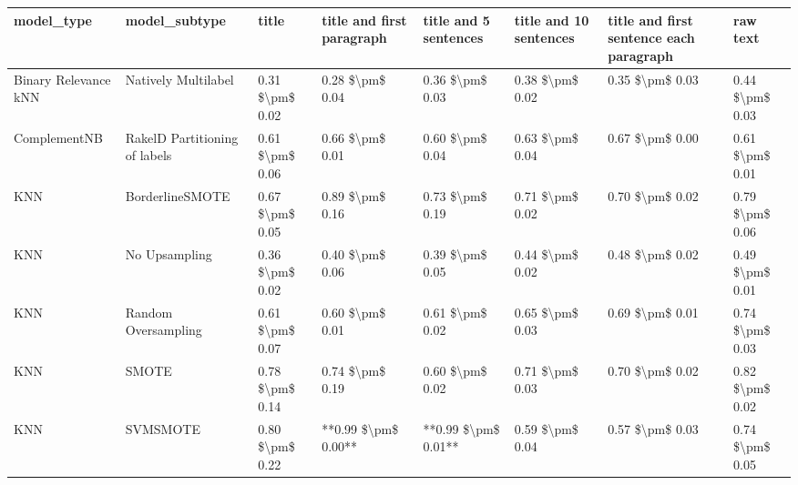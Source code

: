 \begin{tabular}{llllllll}
\toprule
                     model\_type &                 model\_subtype &           title & title and first paragraph & title and 5 sentences & title and 10 sentences & title and first sentence each paragraph &        raw text \\
\midrule
           Binary Relevance kNN &           Natively Multilabel & 0.31 \$\textbackslash pm\$ 0.02 &           0.28 \$\textbackslash pm\$ 0.04 &       0.36 \$\textbackslash pm\$ 0.03 &        0.38 \$\textbackslash pm\$ 0.02 &                         0.35 \$\textbackslash pm\$ 0.03 & 0.44 \$\textbackslash pm\$ 0.03 \\
                   ComplementNB & RakelD Partitioning of labels & 0.61 \$\textbackslash pm\$ 0.06 &           0.66 \$\textbackslash pm\$ 0.01 &       0.60 \$\textbackslash pm\$ 0.04 &        0.63 \$\textbackslash pm\$ 0.04 &                         0.67 \$\textbackslash pm\$ 0.00 & 0.61 \$\textbackslash pm\$ 0.01 \\
                            KNN &               BorderlineSMOTE & 0.67 \$\textbackslash pm\$ 0.05 &           0.89 \$\textbackslash pm\$ 0.16 &       0.73 \$\textbackslash pm\$ 0.19 &        0.71 \$\textbackslash pm\$ 0.02 &                         0.70 \$\textbackslash pm\$ 0.02 & 0.79 \$\textbackslash pm\$ 0.06 \\
                            KNN &                 No Upsampling & 0.36 \$\textbackslash pm\$ 0.02 &           0.40 \$\textbackslash pm\$ 0.06 &       0.39 \$\textbackslash pm\$ 0.05 &        0.44 \$\textbackslash pm\$ 0.02 &                         0.48 \$\textbackslash pm\$ 0.02 & 0.49 \$\textbackslash pm\$ 0.01 \\
                            KNN &           Random Oversampling & 0.61 \$\textbackslash pm\$ 0.07 &           0.60 \$\textbackslash pm\$ 0.01 &       0.61 \$\textbackslash pm\$ 0.02 &        0.65 \$\textbackslash pm\$ 0.03 &                         0.69 \$\textbackslash pm\$ 0.01 & 0.74 \$\textbackslash pm\$ 0.03 \\
                            KNN &                         SMOTE & 0.78 \$\textbackslash pm\$ 0.14 &           0.74 \$\textbackslash pm\$ 0.19 &       0.60 \$\textbackslash pm\$ 0.02 &        0.71 \$\textbackslash pm\$ 0.03 &                         0.70 \$\textbackslash pm\$ 0.02 & 0.82 \$\textbackslash pm\$ 0.02 \\
                            KNN &                      SVMSMOTE & 0.80 \$\textbackslash pm\$ 0.22 &       **0.99 \$\textbackslash pm\$ 0.00** &   **0.99 \$\textbackslash pm\$ 0.01** &        0.59 \$\textbackslash pm\$ 0.04 &                         0.57 \$\textbackslash pm\$ 0.03 & 0.74 \$\textbackslash pm\$ 0.05 \\

\end{tabular}
